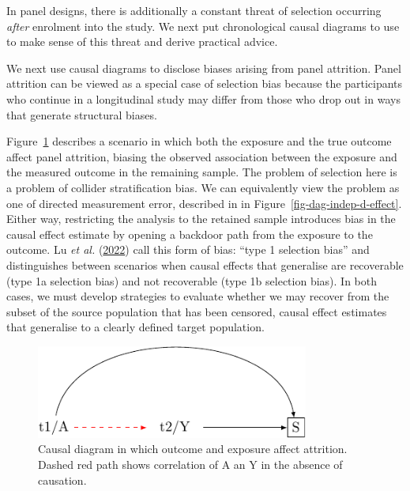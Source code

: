 \documentclass[
  singlecolumn]{article}
\begin{document}
In panel designs, there is additionally a constant threat of selection
occurring \emph{after} enrolment into the study. We next put
chronological causal diagrams to use to make sense of this threat and
derive practical advice.

We next use causal diagrams to disclose biases arising from panel
attrition. Panel attrition can be viewed as a special case of selection
bias because the participants who continue in a longitudinal study may
differ from those who drop out in ways that generate structural biases.

Figure~\ref{fig-dag-8-5} describes a scenario in which both the exposure
and the true outcome affect panel attrition, biasing the observed
association between the exposure and the measured outcome in the
remaining sample. The problem of selection here is a problem of collider
stratification bias. We can equivalently view the problem as one of
directed measurement error, described in in
Figure~\ref{fig-dag-indep-d-effect}. Either way, restricting the
analysis to the retained sample introduces bias in the causal effect
estimate by opening a backdoor path from the exposure to the outcome. Lu
\emph{et al.} (\protect\hyperlink{ref-lu2022}{2022}) call this form of
bias: ``type 1 selection bias'' and distinguishes between scenarios when
causal effects that generalise are recoverable (type 1a selection bias)
and not recoverable (type 1b selection bias). In both cases, we must
develop strategies to evaluate whether we may recover from the subset of
the source population that has been censored, causal effect estimates
that generalise to a clearly defined target population.

\begin{figure}

{\centering \includegraphics[width=0.8\textwidth,height=\textheight]{causal-dags_files/figure-pdf/fig-dag-8-5-1.pdf}

}

\caption{\label{fig-dag-8-5}Causal diagram in which outcome and exposure
affect attrition. Dashed red path shows correlation of A an Y in the
absence of causation.}

\end{figure}
\end{document}
